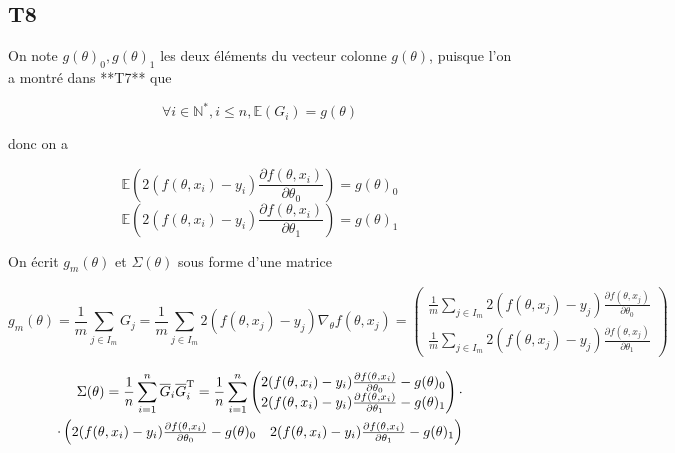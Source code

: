 \documentclass[a4paper,12pt]{article}
\begin{document}
\subsection*{T8}

On note $g(\theta)_0, g(\theta)_1$ les deux éléments du vecteur colonne $g(\theta)$, puisque l'on a montré dans **T7** que

$$\forall i \in \mathbb{N^{*}}, i \le n, \mathbb E (G_i) = g(\theta)$$

donc on a

$$ \mathbb E(2(f(\theta, x_i) - y_i) \frac{\partial f(\theta, x_i)}{\partial \theta_0}) = g(\theta)_0 $$
$$ \mathbb E(2(f(\theta, x_i) - y_i) \frac{\partial f(\theta, x_i)}{\partial \theta_1}) = g(\theta)_1 $$

On écrit $g_{m}(\theta)$ et $\Sigma(\theta)$ sous forme d'une matrice

$$ g_{m}(\theta) = \frac{1}{m} \sum_{j \in I_m} G_j = \frac{1}{m} \sum_{j \in I_m} 2(f(\theta, x_j) - y_j) \nabla_{\theta} f(\theta, x_j) =
\begin{pmatrix}
	\frac{1}{m} \sum_{j \in I_m} 2(f(\theta, x_j) - y_j) \frac{\partial f(\theta, x_j)}{\partial \theta_0} \\
	\frac{1}{m} \sum_{j \in I_m} 2(f(\theta, x_j) - y_j) \frac{\partial f(\theta, x_j)}{\partial \theta_1}
\end{pmatrix}
$$



\[
\begin{aligned}
	\Sigma(\theta) = \frac{1}{n}\sum_{i = 1}^{n} \overline{G}_i\overline{G}_i^{\text T} = \frac{1}{n}\sum_{i = 1}^{n}
	\begin{pmatrix}
		2(f(\theta, x_i) - y_i) \frac{\partial f(\theta, x_i)}{\partial \theta_0} - g(\theta)_0 \\
		2(f(\theta, x_i) - y_i) \frac{\partial f(\theta, x_i)}{\partial \theta_1} - g(\theta)_1
	\end{pmatrix}\cdot\\\cdot
	\begin{pmatrix}
		2(f(\theta, x_i) - y_i) \frac{\partial f(\theta, x_i)}{\partial \theta_0} - g(\theta)_0 &
		2(f(\theta, x_i) - y_i) \frac{\partial f(\theta, x_i)}{\partial \theta_1} - g(\theta)_1
	\end{pmatrix}
\end{aligned}
\]


\end{document}
